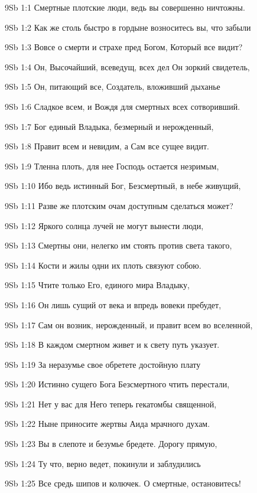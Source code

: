 \vs 9Sb 1:1 Смертные плотские люди, ведь вы совершенно ничтожны.

\vs 9Sb 1:2 Как же столь быстро в гордыне возноситесь вы, что забыли

\vs 9Sb 1:3 Вовсе о смерти и страхе пред Богом, Который все видит?

\vs 9Sb 1:4 Он, Высочайший, всеведущ, всех дел Он зоркий свидетель,

\vs 9Sb 1:5 Он, питающий все,  Создатель, вложивший дыханье

\vs 9Sb 1:6 Сладкое всем, и Вождя для смертных всех сотворивший.

\vs 9Sb 1:7 Бог  единый Владыка, безмерный и нерожденный,

\vs 9Sb 1:8 Правит всем и невидим, а Сам все сущее видит.

\vs 9Sb 1:9 Тленна плоть, для нее Господь остается незримым,

\vs 9Sb 1:10 Ибо ведь истинный Бог, Безсмертный, в небе живущий,

\vs 9Sb 1:11 Разве же плотским очам доступным сделаться может?

\vs 9Sb 1:12 Яркого солнца лучей не могут вынести люди,

\vs 9Sb 1:13 Смертны они, нелегко им стоять против света такого,

\vs 9Sb 1:14 Кости и жилы одни их плоть связуют собою.

\vs 9Sb 1:15 Чтите только Его, единого мира Владыку,

\vs 9Sb 1:16 Он лишь сущий от века и впредь вовеки пребудет,

\vs 9Sb 1:17 Сам он возник, нерожденный, и правит всем во вселенной,

\vs 9Sb 1:18 В каждом смертном живет и к свету путь указует.

\vs 9Sb 1:19 За неразумье свое обретете достойную плату 

\vs 9Sb 1:20 Истинно сущего Бога Безсмертного чтить перестали,

\vs 9Sb 1:21 Нет у вас для Него теперь гекатомбы священной,

\vs 9Sb 1:22 Ныне приносите жертвы Аида мрачного духам.

\vs 9Sb 1:23 Вы в слепоте и безумье бредете. Дорогу прямую,

\vs 9Sb 1:24 Ту что, верно ведет, покинули и заблудились

\vs 9Sb 1:25 Все средь шипов и колючек. О смертные, остановитесь!

